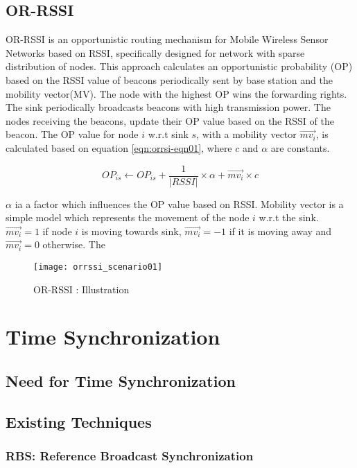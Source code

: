 \subsection{OR-RSSI}
OR-RSSI is an opportunistic routing mechanism for Mobile Wireless Sensor Networks based on RSSI, specifically designed for network with sparse distribution of nodes. This approach calculates an opportunistic probability (OP) based on the RSSI value of beacons periodically sent by base station and the mobility vector(MV). The node with the highest OP wins the forwarding rights. The sink periodically broadcasts beacons with high transmission power. The nodes receiving the beacons, update their OP value based on the RSSI of the beacon. The OP value for node $i$ w.r.t sink $s$, with a mobility vector $\vec{mv_i}$, is calculated based on equation \ref{eqn:orrsi-eqn01}, where $c$ and $\alpha$ are constants. 

\begin{equation}
	OP_{is} \gets OP_{is} + \frac{1}{|RSSI|} \times \alpha + \vec{mv_i} \times c
	\label{eqn:orrsi-eqn01}
\end{equation}

$\alpha$ ia a factor which influences the OP value based on RSSI. Mobility vector is a simple model which represents the movement of the node $i$ w.r.t the sink. $\vec{mv_i} = 1$ if node $i$ is moving towards sink, $\vec{mv_i} = -1$ if it is moving away and $\vec{mv_i} = 0$ otherwise. The 


\begin{figure}[h]{} 
  \begin{center}
		\texttt{[image: orrssi\_scenario01]}
		\caption{OR-RSSI : Illustration}
	\label{fig:orrsssi-scenario}
  \end{center}
\end{figure}


\section{Time Synchronization}

\subsection{Need for Time Synchronization}
\subsection{Existing Techniques}
\subsubsection{RBS: Reference Broadcast Synchronization}
